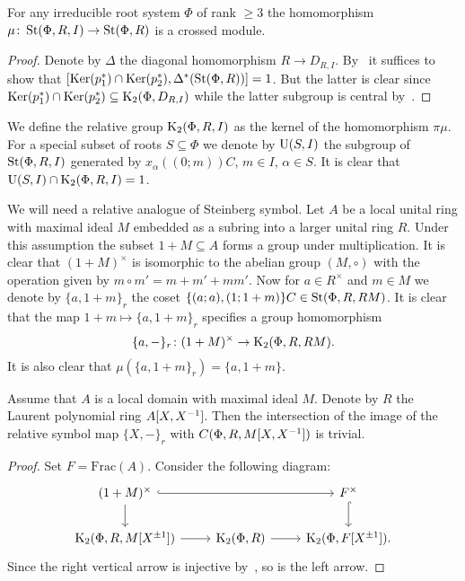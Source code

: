 \begin{lemma} \label{lem:rel-Steinberg-crossed-module}
For any irreducible root system $\Phi$ of rank $\geq 3$ the homomorphism $\mu \colon \operatorname{St}(\Phi, R, I) \to \operatorname{St}(\Phi, R)$ is a crossed module.
\end{lemma}
\begin{proof}
    Denote by $\Delta$ the diagonal homomorphism $R \to D_{R, I}.$
    By~\cite[Proposition~6]{Lo78} it suffices to show that $[\operatorname{Ker}(p_1^*) \cap \operatorname{Ker}(p_2^*), \Delta^*(\operatorname{St}(\Phi, R))] = 1$.
    But the latter is clear since $\operatorname{Ker}(p_1^*) \cap \operatorname{Ker}(p_2^*) \subseteq \operatorname{K}_2(\Phi, D_{R, I})$ while the latter subgroup is central by~\cite{LSV1}.
\end{proof}

We define the relative group $\operatorname{K}_2(\Phi, R, I)$ as the kernel of the homomorphism $\pi \mu$.
For a special subset of roots $S \subseteq \Phi$ we denote by $\operatorname{U}(S, I)$ the subgroup of $\operatorname{St}(\Phi, R, I)$ generated by $x_\alpha((0;m))C$, $m \in I$, $\alpha \in S$.
It is clear that $\operatorname{U}(S, I) \cap \operatorname{K}_2(\Phi, R, I) = 1$.

We will need a relative analogue of Steinberg symbol.
Let $A$ be a local unital ring with maximal ideal $M$ embedded as a subring into a larger unital ring $R$.
Under this assumption the subset $1+M \subseteq A$ forms a group under multiplication.
It is clear that $(1+M)^\times$ is isomorphic to the abelian group $(M, \circ)$ with the operation given by $m \circ m' = m + m' + mm'$.
Now for $a \in R^\times$ and $m \in M$ we denote by $\{a, 1+m\}_r$ the coset $\{(a; a), (1; 1+m)\}C \in \operatorname{St}(\Phi, R, RM)$.
It is clear that the map $1+m \mapsto \{a, 1+m\}_r$ specifies a group homomorphism
\begin{equation} \label{eq:relative-symbol} \{ a, -\}_r \colon (1+M)^\times \to \operatorname{K}_2(\Phi, R, RM). \end{equation}
It is also clear that $\mu(\{a, 1+m\}_r) = \{a, 1+m\}$.

\begin{lemma}\label{lem:symbols}
Assume that $A$ is a local domain with maximal ideal $M$.
Denote by $R$ the Laurent polynomial ring $A[X, X^{-1}]$.
Then the intersection of the image of the relative symbol map $\{X, -\}_r$ with $C(\Phi, R, M[X, X^{-1}])$ is trivial.
\end{lemma}
\begin{proof}
    Set $F = \mathrm{Frac}(A)$.
    Consider the following diagram:
    \[\begin{tikzcd}
    (1+M)^\times \ar[hookrightarrow, rr] \ar[d] &  & F^\times \ar[hookrightarrow, d] \\
    \K_2(\Phi ,R, M[X^{\pm 1}]) \ar[r] & \K_2(\Phi, R) \ar[r] & \K_2(\Phi, F[X^{\pm 1}]).
    \end{tikzcd}\]
    Since the right vertical arrow is injective by~\cite[Lemma~2.2]{LS20}, so is the left arrow.
\end{proof}

